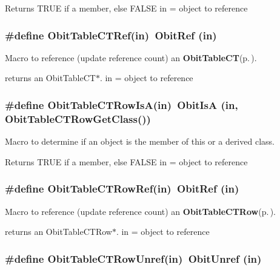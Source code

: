 Returns TRUE if a member, else FALSE in = object to reference 
\subsubsection{\setlength{\rightskip}{0pt plus 5cm}\#define Obit\-Table\-CTRef(in)\ Obit\-Ref (in)}\label{ObitTableCT_8h_a2}


Macro to reference (update reference count) an {\bf Obit\-Table\-CT}{\rm (p.\,\pageref{structObitTableCT})}. 

returns an Obit\-Table\-CT$\ast$. in = object to reference 
\subsubsection{\setlength{\rightskip}{0pt plus 5cm}\#define Obit\-Table\-CTRow\-Is\-A(in)\ Obit\-Is\-A (in, Obit\-Table\-CTRow\-Get\-Class())}\label{ObitTableCT_8h_a6}


Macro to determine if an object is the member of this or a derived class. 

Returns TRUE if a member, else FALSE in = object to reference 
\subsubsection{\setlength{\rightskip}{0pt plus 5cm}\#define Obit\-Table\-CTRow\-Ref(in)\ Obit\-Ref (in)}\label{ObitTableCT_8h_a5}


Macro to reference (update reference count) an {\bf Obit\-Table\-CTRow}{\rm (p.\,\pageref{structObitTableCTRow})}. 

returns an Obit\-Table\-CTRow$\ast$. in = object to reference 
\subsubsection{\setlength{\rightskip}{0pt plus 5cm}\#define Obit\-Table\-CTRow\-Unref(in)\ Obit\-Unref (in)}\label{ObitTableCT_8h_a4}


